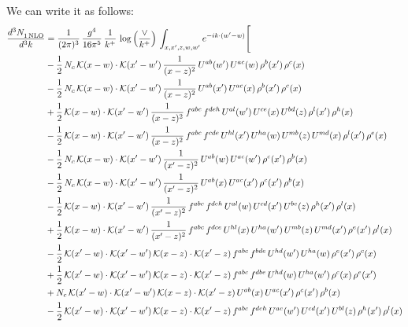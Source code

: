 \documentclass[9pt]{article}
\numberwithin{equation}{section}
\begin{document}
We can write it as follows:
\begin{align}
    \frac{d^{3}N_{1\,\rm NLO}^{\rm}}{d^{3}k}  & = \frac{1}{(2\pi)^{3}}\,\frac{g^{4}}{16\pi^{5}}\,\frac{1}{k^{+}}\,\log{\left(\frac{\vee}{k^{+}}\right)}\, \int_{x,x',z,w,w'}e^{-ik\cdot(w'-w)}\Bigg[\notag\\ & 
    -\frac{1}{2}\,N_{c}\,\mathcal{K}(x-w)\cdot\mathcal{K}(x'-w')\,\frac{1}{(x-z)^{2}}\,U^{ab}(w')\,U^{ac}(w)\,\rho^{b}(x')\,\rho^{c}(x)\notag\\
&-\frac{1}{2}\,N_{c}\,\mathcal{K}(x-w)\cdot\mathcal{K}(x'-w')\,\frac{1}{(x-z)^{2}}\,U^{ab}(x')\,U^{ac}(x)\,\rho^{b}(x')\,\rho^{c}(x)\notag\\
&+\frac{1}{2}\,\mathcal{K}(x-w)\cdot\mathcal{K}(x'-w')\,\frac{1}{(x-z)^{2}}\,f^{abc}\,f^{deh}\,U^{al}(w')\,U^{ce}(x)\,U^{bd}(z)\,\rho^{l}(x')\,\rho^{h}(x)\notag\\
&-\frac{1}{2}\,\mathcal{K}(x-w)\cdot\mathcal{K}(x'-w')\,\frac{1}{(x-z)^{2}}\,f^{abc}\,f^{cde}\,U^{hl}(x')\,U^{ha}(w)\,U^{mb}(z)\,U^{md}(x)\,\rho^{l}(x')\,\rho^{e}(x)\notag \\
&-\frac{1}{2}\,N_{c}\,\mathcal{K}(x-w)\cdot\mathcal{K}(x'-w')\,\frac{1}{(x'-z)^{2}}\,U^{ab}(w)\,U^{ac}(w')\,\rho^{c}(x')\,\rho^{b}(x)\notag \\
&-\frac{1}{2}\,N_{c}\,\mathcal{K}(x-w)\cdot\mathcal{K}(x'-w')\,\frac{1}{(x'-z)^{2}}\,U^{ab}(x)\,U^{ac}(x')\,\rho^{c}(x')\,\rho^{b}(x)\notag \\
&-\frac{1}{2}\,\mathcal{K}(x-w)\cdot\mathcal{K}(x'-w')\,\frac{1}{(x'-z)^{2}}\,f^{abc}\,f^{deh}\,U^{al}(w)\,U^{cd}(x')\,U^{be}(z)\,\rho^{h}(x')\,\rho^{l}(x)\notag \\
&+\frac{1}{2}\,\mathcal{K}(x-w)\cdot\mathcal{K}(x'-w')\,\frac{1}{(x'-z)^{2}}\,f^{abc}\,f^{dce}\,U^{hl}(x)\,U^{ha}(w')\,U^{mb}(z)\,U^{md}(x')\,\rho^{e}(x')\,\rho^{l}(x)\notag \\
&-\frac{1}{2}\,\mathcal{K}(x'-w)\cdot\mathcal{K}(x'-w')\,\mathcal{K}(x-z)\cdot\mathcal{K}(x'-z)\,f^{abc}\,f^{bde}\,U^{hd}(w')\,U^{ha}(w)\,\rho^{e}(x')\,\rho^{c}(x)\notag \\
&+\frac{1}{2}\,\mathcal{K}(x'-w)\cdot\mathcal{K}(x'-w')\,\mathcal{K}(x-z)\cdot\mathcal{K}(x'-z)\,f^{abc}\,f^{dbe}\,U^{hd}(w)\,U^{ha}(w')\,\rho^{c}(x)\,\rho^{e}(x')\notag \\
&+N_{c}\,\mathcal{K}(x'-w)\cdot\mathcal{K}(x'-w')\,\mathcal{K}(x-z)\cdot\mathcal{K}(x'-z)\,U^{ab}(x)\,U^{ac}(x')\,\rho^{c}(x')\,\rho^{b}(x)\notag \\
&-\frac{1}{2}\,\mathcal{K}(x'-w)\cdot\mathcal{K}(x'-w')\,\mathcal{K}(x-z)\cdot\mathcal{K}(x'-z)\,f^{abc}\,f^{deh}\,U^{ae}(w')\,U^{cd}(x')\,U^{bl}(z)\,\rho^{h}(x')\,\rho^{l}(x)\notag \\

\end{align}
\end{document}
